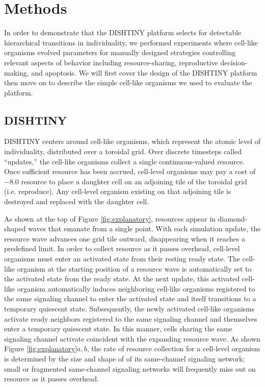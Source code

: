 \section{Methods}

In order to demonstrate that the DISHTINY platform selects for detectable hierarchical transitions in individuality, we performed experiments where cell-like organisms evolved parameters for manually designed strategies controlling relevant aspects of behavior including resource-sharing, reproductive decision-making, and apoptosis.
We will first cover the design of the DISHTINY platform then move on to describe the simple cell-like organisms we used to evaluate the platform.

\subsection{DISHTINY}



DISHTINY centers around cell-like organisms, which represent the atomic level of individuality, distributed over a toroidal grid.
Over discrete timesteps called ``updates,'' the cell-like organisms collect a single continuous-valued resource.
Once sufficient resource has been accrued, cell-level organisms may pay a cost of $-8.0$ resource to place a daughter cell on an adjoining tile of the toroidal grid (i.e. reproduce).
Any cell-level organism existing on that adjoining tile is destroyed and replaced with the daughter cell.

As shown at the top of Figure \ref{fig:explanatory}, resources appear in diamond-shaped waves that emanate from a single point.
With each simulation update, the resource wave advances one grid tile outward, disappearing when it reaches a predefined limit.
In order to collect resource as it passes overhead, cell-level organisms must enter an activated state from their resting ready state.
The cell-like organism at the starting position of a resource wave is automatically set to the activated state from the ready state.
At the next update, this activated cell-like organism automatically induces neighboring cell-like organisms registered to the same signaling channel to enter the activated state and itself transitions to a temporary quiescent state.
Subsequently, the newly activated cell-like organisms activate ready neighbors registered to the same signaling channel and themselves enter a temporary quiescent state.
In this manner, cells sharing the same signaling channel activate coincident with the expanding resource wave.
As shown Figure \ref{fig:explanatory}$a,b$, the rate of resource collection for a cell-level organism is determined by the size and shape of of its same-channel signaling network;
small or fragmented same-channel signaling networks will frequently miss out on resource as it passes overhead.

